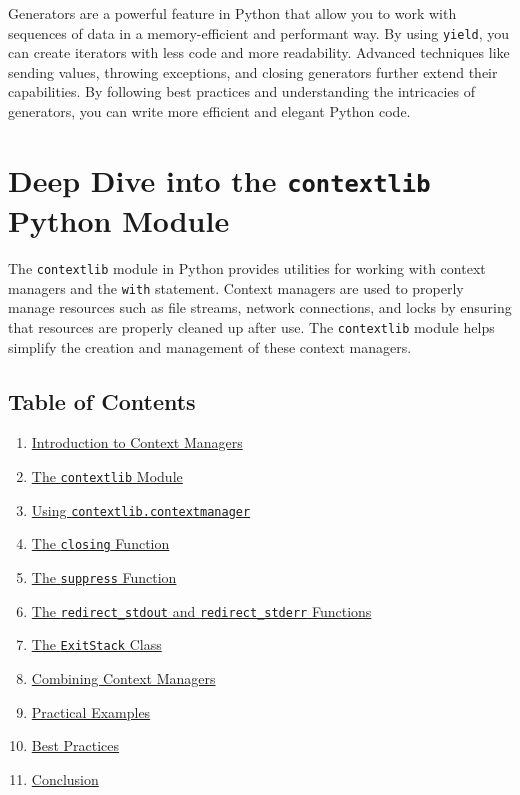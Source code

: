 \documentclass[
  letterpaper,
  DIV=11,
  numbers=noendperiod]{scrreprt}
\providecommand{\tightlist}{%
  \setlength{\itemsep}{0pt}\setlength{\parskip}{0pt}}\usepackage{longtable,booktabs,array}
\begin{document}
Generators are a powerful feature in Python that allow you to work with
sequences of data in a memory-efficient and performant way. By using
\texttt{yield}, you can create iterators with less code and more
readability. Advanced techniques like sending values, throwing
exceptions, and closing generators further extend their capabilities. By
following best practices and understanding the intricacies of
generators, you can write more efficient and elegant Python code.


\chapter{\texorpdfstring{Deep Dive into the \texttt{contextlib} Python
Module}{Deep Dive into the contextlib Python Module}}\label{deep-dive-into-the-contextlib-python-module}

The \texttt{contextlib} module in Python provides utilities for working
with context managers and the \texttt{with} statement. Context managers
are used to properly manage resources such as file streams, network
connections, and locks by ensuring that resources are properly cleaned
up after use. The \texttt{contextlib} module helps simplify the creation
and management of these context managers.

\section{Table of Contents}\label{table-of-contents-13}

\begin{enumerate}
\def\labelenumi{\arabic{enumi}.}
\tightlist
\item
  \hyperref[introduction-to-context-managers]{Introduction to Context
  Managers}
\item
  \hyperref[the-contextlib-module]{The \texttt{contextlib} Module}
\item
  \hyperref[using-contextlibcontextmanager]{Using
  \texttt{contextlib.contextmanager}}
\item
  \hyperref[the-closing-function]{The \texttt{closing} Function}
\item
  \hyperref[the-suppress-function]{The \texttt{suppress} Function}
\item
  \hyperref[the-redirect_stdout-and-redirect_stderr-functions]{The
  \texttt{redirect\_stdout} and \texttt{redirect\_stderr} Functions}
\item
  \hyperref[the-exitstack-class]{The \texttt{ExitStack} Class}
\item
  \hyperref[combining-context-managers]{Combining Context Managers}
\item
  \hyperref[practical-examples]{Practical Examples}
\item
  \hyperref[best-practices]{Best Practices}
\item
  \hyperref[conclusion]{Conclusion}
\end{enumerate}
\end{document}
